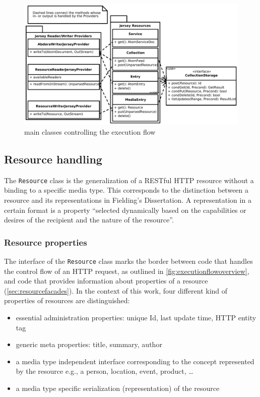 \documentclass[11pt,a4paper,headsepline,twoside]{scrartcl}		%
\begin{document}
\begin{figure}[htb]
  \advance\leftskip-1cm
  \includegraphics[width=1.2\textwidth]{executionflowoverview}

  \caption{main classes controlling the execution flow}
  \label{fig:executionflowoverview}
\end{figure}

\subsection{Resource handling}
\label{sec:resource-handling}

The \lstinline:Resource: class is the generalization of a RESTful HTTP resource
without a binding to a specific media type. This corresponds to the distinction
between a resource and its representations in Fielding's
Dissertation\cite[sec. 5.2.1.1]{Fielding2000}. A representation in a certain
format is a property ``selected dynamically based on the capabilities or desires of
the recipient and the nature of the
resource''\cite[p. 87]{Fielding2000}.

\subsubsection{Resource properties}
\label{sec:resource-properties}

The interface of the \lstinline:Resource: class marks the border between code
that handles the control flow of an HTTP request, as outlined in
\autoref{fig:executionflowoverview}, and code that provides information about
properties of a resource (\autoref{sec:resourcefacades}). In the context of this
work, four different kind of properties of resources are distinguished:

\begin{itemize}
\item essential administration properties: unique Id, last update time, HTTP
  entity tag
\item generic meta properties: title, summary, author
\item a media type independent interface corresponding to the concept represented
  by the resource e.g., a person, location, event, product, \ldots
\item a media type specific serialization (representation) of the resource
\end{itemize}
\end{document}
